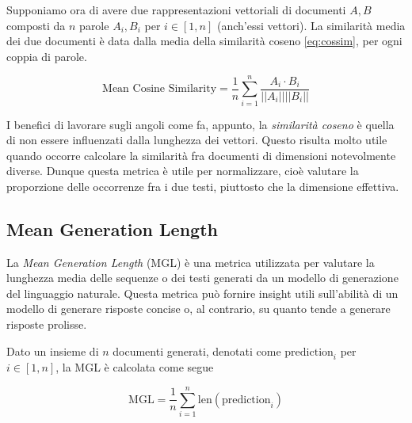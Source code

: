 \documentclass[12pt,a4paper,twoside,openright]{book}
\begin{document}
Supponiamo ora di avere due rappresentazioni vettoriali di documenti $A, B$ composti da $n$ parole $A_i, B_i$ per $i \in [1, n]$ (anch'essi vettori). La similarità media dei due documenti è data dalla media della similarità coseno \ref{eq:cossim}, per ogni coppia di parole.

\begin{equation*}
    \text{Mean Cosine Similarity} = \frac{1}{n} \sum_{i=1}^n \frac{A_i \cdot B_i}{\vert \vert A_i \vert \vert \vert \vert B_i \vert \vert}
\end{equation*}

I benefici di lavorare sugli angoli come fa, appunto, la \emph{similarità coseno} è quella di non essere influenzati dalla lunghezza dei vettori. Questo risulta molto utile quando occorre calcolare la similarità fra documenti di dimensioni notevolmente diverse. Dunque questa metrica è utile per normalizzare, cioè valutare la proporzione delle occorrenze fra i due testi, piuttosto che la dimensione effettiva.


\subsection{Mean Generation Length}
La \emph{Mean Generation Length} (MGL) è una metrica utilizzata per valutare la lunghezza media delle sequenze o dei testi generati da un modello di generazione del linguaggio naturale. Questa metrica può fornire insight utili sull'abilità di un modello di generare risposte concise o, al contrario, su quanto tende a generare risposte prolisse.

Dato un insieme di $n$ documenti generati, denotati come $\text{prediction}_i$ per $i \in [1,n]$, la MGL è calcolata come segue 

\begin{equation*}
    \text{MGL} = \frac{1}{n} \sum_{i=1}^n \text{len}(\text{prediction}_i)
\end{equation*}
\end{document}
